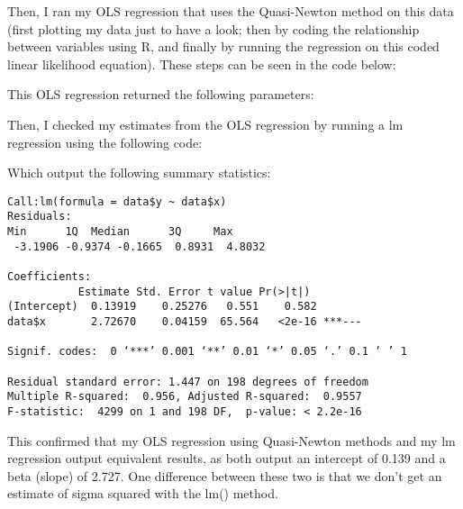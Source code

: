 \documentclass[12pt,letterpaper]{article}
\begin{document}
 

Then, I ran my OLS regression that uses the Quasi-Newton method on this data (first plotting my data just to have a look; then by coding the relationship between variables using R, and finally by running the regression on this coded linear likelihood equation). These steps can be seen in the code below:
 

This OLS regression returned the following parameters:
 

Then, I checked my estimates from the OLS regression by running a lm regression using the following code:
 
Which output the following summary statistics:
	\begin{verbatim}
Call:lm(formula = data$y ~ data$x)
Residuals:    
Min      1Q  Median      3Q     Max
 -3.1906 -0.9374 -0.1665  0.8931  4.8032
 
Coefficients:            
           Estimate Std. Error t value Pr(>|t|)    
(Intercept)  0.13919    0.25276   0.551    0.582    
data$x       2.72670    0.04159  65.564   <2e-16 ***---

Signif. codes:  0 ‘***’ 0.001 ‘**’ 0.01 ‘*’ 0.05 ‘.’ 0.1 ‘ ’ 1

Residual standard error: 1.447 on 198 degrees of freedom
Multiple R-squared:  0.956,	Adjusted R-squared:  0.9557 
F-statistic:  4299 on 1 and 198 DF,  p-value: < 2.2e-16
\end{verbatim} 

This confirmed that my OLS regression using Quasi-Newton methods and my lm regression output equivalent results, as both output an intercept of 0.139 and a beta (slope) of 2.727. One difference between these two is that we don't get an estimate of sigma squared with the lm() method.
\end{document}
